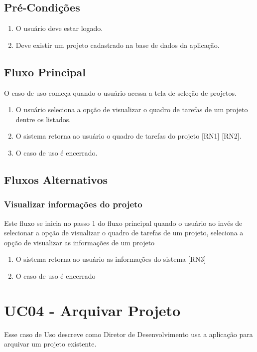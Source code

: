 \subsection{Pré-Condições}

\begin{enumerate}
  \item O usuário deve estar logado.
  \item Deve existir um projeto cadastrado na base de dados da aplicação. 
\end{enumerate}

\subsection{Fluxo Principal}
O caso de uso começa quando o usuário acessa a tela de seleção de projetos.

\begin{enumerate}
  \item O usuário seleciona a opção de visualizar o quadro de tarefas de um projeto dentre os listados.
  \item O sistema retorna ao usuário o quadro de tarefas do projeto [RN1] [RN2].
  \item O caso de uso é encerrado. 
\end{enumerate}

\subsection{Fluxos Alternativos}

\subsubsection{Visualizar informações do projeto}
Este fluxo se inicia no passo 1 do fluxo principal quando o usuário ao invés de selecionar a opção de visualizar o quadro de tarefas de um projeto, seleciona a opção de visualizar as informações de um projeto

\begin{enumerate}
  \item O sistema retorna ao usuário as informações do sistema [RN3]
  \item O caso de uso é encerrado
\end{enumerate}

\section{UC04 - Arquivar Projeto}
Esse caso de Uso descreve como Diretor de Desenvolvimento usa a aplicação para arquivar um projeto existente.

